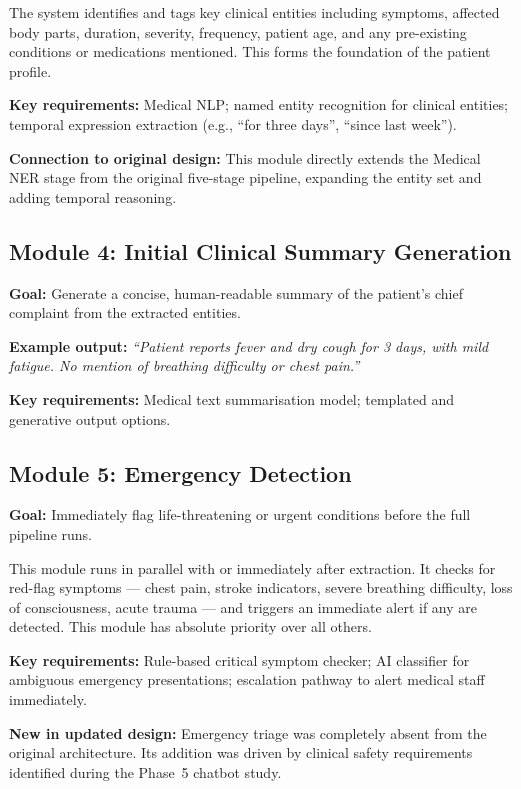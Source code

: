\documentclass[12pt,a4paper]{article}
\begin{document}
The system identifies and tags key clinical entities including symptoms,
affected body parts, duration, severity, frequency, patient age, and
any pre-existing conditions or medications mentioned. This forms the
foundation of the patient profile.

\textbf{Key requirements:} Medical NLP; named entity recognition for
clinical entities; temporal expression extraction (e.g., ``for three
days'', ``since last week'').

\textbf{Connection to original design:} This module directly extends the
Medical NER stage from the original five-stage pipeline, expanding the
entity set and adding temporal reasoning.

\subsection{Module 4: Initial Clinical Summary Generation}
\label{sec:m4}

\textbf{Goal:} Generate a concise, human-readable summary of the
patient's chief complaint from the extracted entities.

\textbf{Example output:} \textit{``Patient reports fever and dry cough
for 3 days, with mild fatigue. No mention of breathing difficulty or
chest pain.''}

\textbf{Key requirements:} Medical text summarisation model; templated
and generative output options.

\subsection{Module 5: Emergency Detection}
\label{sec:m5}

\textbf{Goal:} Immediately flag life-threatening or urgent conditions
before the full pipeline runs.

This module runs in parallel with or immediately after extraction. It
checks for red-flag symptoms --- chest pain, stroke indicators, severe
breathing difficulty, loss of consciousness, acute trauma --- and
triggers an immediate alert if any are detected. This module has
absolute priority over all others.

\textbf{Key requirements:} Rule-based critical symptom checker; AI
classifier for ambiguous emergency presentations; escalation pathway to
alert medical staff immediately.

\textbf{New in updated design:} Emergency triage was completely absent
from the original architecture. Its addition was driven by clinical
safety requirements identified during the Phase~5 chatbot study.
\end{document}
